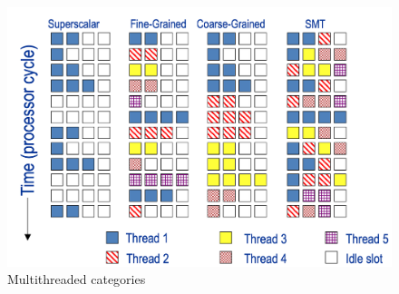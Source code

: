 \begin{figure}
    \centering
    \includegraphics[scale=0.25]{images/multithreaded-categories}
    \caption{Multithreaded categories}
    \label{fig:multithreaded-categories}
\end{figure}



